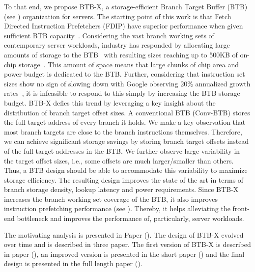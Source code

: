 \documentclass[../main.tex]{subfiles}
\begin{document}
\begin{refsection}
To that end, we propose BTB-X, a storage-efficient Branch Target
Buffer (BTB) (see ) organization for servers.
The starting point of this work is that Fetch Directed Instruction
Prefetchers (FDIP) have superior performance when given sufficient BTB
capacity~\cite{ishii21_re_fetch_direc_instr_prefet}. Considering the
vast branch working sets of contemporary server workloads, industry
has responded by allocating large amounts of storage to the
BTB~\cite{neoverse,IBMz,zen2} with resulting sizes reaching up to
500KB of on-chip storage~\cite{exynos}. This amount of space means
that large chunks of chip area and power budget is dedicated to the
BTB. Further, considering that instruction set sizes show no sign of
slowing down with Google observing 20\% annualized growth
rates~\cite{kanev15_profil}, it is infeasible to respond to this
simply by increasing the BTB storage budget. BTB-X defies this trend
by leveraging a key insight about the distribution of branch target
offset sizes. A conventional BTB (Conv-BTB) stores the full target
address of every branch it holds. We make a key observation that most
branch targets are close to the branch instructions
themselves. Therefore, we can achieve significant storage savings by
storing branch target offsets instead of the full target addresses in
the BTB. We further observe large variability in the target offset
sizes, i.e., some offsets are much larger/smaller than others. Thus, a
BTB design should be able to accommodate this variability to maximize
storage efficiency. The resulting design improves the state of the art
in terms of branch storage density, lookup latency and power
requirements. Since BTB-X increases the branch working set coverage of
the BTB, it also improves instruction prefetching performance (see
). Thereby, it helps alleviating the
front-end bottleneck and improves the performance of, particularly,
server workloads.

The motivating analysis is presented in Paper  ().
The design of BTB-X evolved over time and is described in three paper. The first version of BTB-X is described in paper 
(), an improved version is presented in the
short paper  () and the final design is
presented in the full length paper  ().

\vspace*{1em}


\end{refsection}
\end{document}
